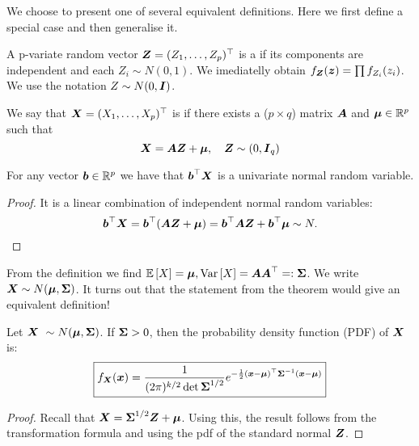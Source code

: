 We choose to present one of several equivalent definitions. Here we first define a special case and then generalise it. 
\begin{definition}
    A p-variate random vector $\boldsymbol{Z}=(Z_1, \dots, Z_p)^\top$ is a  if its components are independent and each $Z_i\sim N(0,1)$. We imediatelly obtain $f_{\boldsymbol{Z}}(\boldsymbol{z}) = \prod f_{Z_i} (z_i)$. We use the notation $Z\sim N(0, \boldsymbol{I})$.
\end{definition}
\begin{definition}
    We say that $\boldsymbol{X} = (X_1,\dots, X_p)^\top$ is  if there exists a ($p\times q$) matrix $\boldsymbol{A}$ and $\boldsymbol{\mu}\in\mathbb{R}^p$ such that 
    $$
        \boldsymbol{X} = \boldsymbol{A} \boldsymbol{Z} + \boldsymbol{\mu}, \quad \boldsymbol{Z} \sim (0, \boldsymbol{I}_q)
    $$
\end{definition}
\begin{theorem}
    For any vector $\boldsymbol{b}\in\mathbb{R}^p$ we have that $\boldsymbol{b}^\top \boldsymbol{X}$ is a univariate normal random variable.
\end{theorem}
\begin{proof}
    It is a linear combination of independent normal random variables:
    $$
        \boldsymbol{b}^\top \boldsymbol{X} = \boldsymbol{b}^\top(\boldsymbol{A}\boldsymbol{Z} + \boldsymbol{\mu}) = \boldsymbol{b}^\top \boldsymbol{A} \boldsymbol{Z} + \boldsymbol{b}^\top\boldsymbol{\mu} \sim N. 
    $$
\end{proof}
From the definition we find $\mathbb{E}\left[X\right] = \boldsymbol{\mu}, \mathrm{Var}\left[X\right] = \boldsymbol{A}\boldsymbol{A}^\top =: \boldsymbol{\Sigma}$. We write $\X \sim N(\M, \SS)$. It turns out that the statement from the theorem would give an equivalent definition!
\begin{theorem}
    Let $\X \sim N(\M, \SS)$. If $\boldsymbol{\Sigma} > 0$, then the probability density function (PDF) of $\boldsymbol{X}$ is:
    \begin{equation}
        \boxed{
            f_{\boldsymbol{X}} (\boldsymbol{x}) = \frac{1}{(2\pi)^{k/2}\det{\boldsymbol{\Sigma}}^{1/2}} e^{-\frac{1}{2}(\boldsymbol{x}-\boldsymbol{\mu})^\top\boldsymbol{\Sigma}^{-1}(\boldsymbol{x}-\boldsymbol{\mu})}
        }        
    \end{equation}
\end{theorem}
\begin{proof}
    Recall that $\boldsymbol{X} = \boldsymbol{\Sigma}^{1/2}\boldsymbol{Z} + \boldsymbol{\mu}$. Using this, the result follows from the transformation formula and using the pdf of the standard normal $\boldsymbol{Z}$.  
\end{proof}
 
